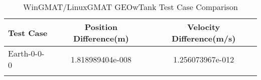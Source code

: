 \begin{table}[htbp!]
\centering
\caption{ WinGMAT/LinuxGMAT GEOwTank Test Case Comparison}
      \begin{tabular}{lcc}
      \hline\hline
          Test Case & Position Difference(m) & Velocity Difference(m/s) \\
         \hline
         Earth-0-0-0 & 1.818989404e-008 & 1.256073967e-012 \\
      \hline\hline
      \label{Table: GEOwTank WinGMAT-LinuxGMAT Table} 
\end{tabular}
\end{table}
